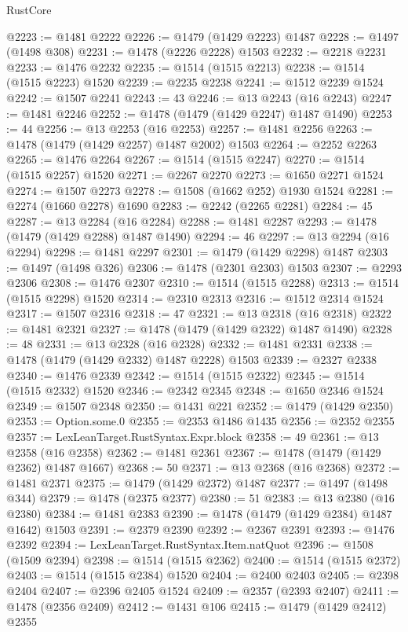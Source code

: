 \begin{lexlean}{RustCore}
\begin{coremodule}
@2223 := @1481 @2222
@2226 := @1479 (@1429 @2223) @1487
@2228 := @1497 (@1498 @308)
@2231 := @1478 (@2226 @2228) @1503
@2232 := @2218 @2231
@2233 := @1476 @2232
@2235 := @1514 (@1515 @2213)
@2238 := @1514 (@1515 @2223) @1520
@2239 := @2235 @2238
@2241 := @1512 @2239 @1524
@2242 := @1507 @2241
@2243 := 43
@2246 := @13 @2243 (@16 @2243)
@2247 := @1481 @2246
@2252 := @1478 (@1479 (@1429 @2247) @1487 @1490)
@2253 := 44
@2256 := @13 @2253 (@16 @2253)
@2257 := @1481 @2256
@2263 := @1478 (@1479 (@1429 @2257) @1487 @2002) @1503
@2264 := @2252 @2263
@2265 := @1476 @2264
@2267 := @1514 (@1515 @2247)
@2270 := @1514 (@1515 @2257) @1520
@2271 := @2267 @2270
@2273 := @1650 @2271 @1524
@2274 := @1507 @2273
@2278 := @1508 (@1662 @252) @1930 @1524
@2281 := @2274 (@1660 @2278) @1690
@2283 := @2242 (@2265 @2281)
@2284 := 45
@2287 := @13 @2284 (@16 @2284)
@2288 := @1481 @2287
@2293 := @1478 (@1479 (@1429 @2288) @1487 @1490)
@2294 := 46
@2297 := @13 @2294 (@16 @2294)
@2298 := @1481 @2297
@2301 := @1479 (@1429 @2298) @1487
@2303 := @1497 (@1498 @326)
@2306 := @1478 (@2301 @2303) @1503
@2307 := @2293 @2306
@2308 := @1476 @2307
@2310 := @1514 (@1515 @2288)
@2313 := @1514 (@1515 @2298) @1520
@2314 := @2310 @2313
@2316 := @1512 @2314 @1524
@2317 := @1507 @2316
@2318 := 47
@2321 := @13 @2318 (@16 @2318)
@2322 := @1481 @2321
@2327 := @1478 (@1479 (@1429 @2322) @1487 @1490)
@2328 := 48
@2331 := @13 @2328 (@16 @2328)
@2332 := @1481 @2331
@2338 := @1478 (@1479 (@1429 @2332) @1487 @2228) @1503
@2339 := @2327 @2338
@2340 := @1476 @2339
@2342 := @1514 (@1515 @2322)
@2345 := @1514 (@1515 @2332) @1520
@2346 := @2342 @2345
@2348 := @1650 @2346 @1524
@2349 := @1507 @2348
@2350 := @1431 @221
@2352 := @1479 (@1429 @2350)
@2353 := Option.some.{0}
@2355 := @2353 @1486 @1435
@2356 := @2352 @2355
@2357 := LexLeanTarget.RustSyntax.Expr.block
@2358 := 49
@2361 := @13 @2358 (@16 @2358)
@2362 := @1481 @2361
@2367 := @1478 (@1479 (@1429 @2362) @1487 @1667)
@2368 := 50
@2371 := @13 @2368 (@16 @2368)
@2372 := @1481 @2371
@2375 := @1479 (@1429 @2372) @1487
@2377 := @1497 (@1498 @344)
@2379 := @1478 (@2375 @2377)
@2380 := 51
@2383 := @13 @2380 (@16 @2380)
@2384 := @1481 @2383
@2390 := @1478 (@1479 (@1429 @2384) @1487 @1642) @1503
@2391 := @2379 @2390
@2392 := @2367 @2391
@2393 := @1476 @2392
@2394 := LexLeanTarget.RustSyntax.Item.natQuot
@2396 := @1508 (@1509 @2394)
@2398 := @1514 (@1515 @2362)
@2400 := @1514 (@1515 @2372)
@2403 := @1514 (@1515 @2384) @1520
@2404 := @2400 @2403
@2405 := @2398 @2404
@2407 := @2396 @2405 @1524
@2409 := @2357 (@2393 @2407)
@2411 := @1478 (@2356 @2409)
@2412 := @1431 @106
@2415 := @1479 (@1429 @2412) @2355

\end{coremodule}
\end{lexlean}
